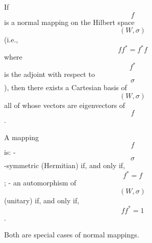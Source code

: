 If $$f$$ is a normal mapping on the Hilbert space $$(W, \sigma)$$ (i.e., $$ff^* = f^*f$$ where $$f^*$$ is the adjoint with respect to $$\sigma$$), then there exists a Cartesian basis of $$(W, \sigma)$$ all of whose vectors are eigenvectors of $$f$$.

A mapping $$f$$ is:
- $$\sigma$$-symmetric (Hermitian) if, and only if, $$f^* = f$$;
- an automorphism of $$(W, \sigma)$$ (unitary) if, and only if, $$ff^* = 1$$.

Both are special cases of normal mappings.
